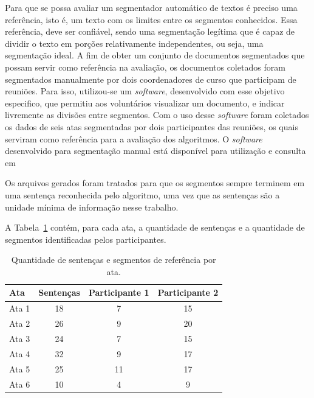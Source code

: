  Para que se possa avaliar um segmentador automático de textos é preciso uma referência, isto é, um texto com os limites entre os segmentos conhecidos. Essa referência, deve ser confiável, sendo uma segmentação legítima que é capaz de dividir o texto em porções relativamente independentes, ou seja, uma segmentação ideal.
A fim de obter um conjunto de documentos segmentados que possam servir como referência na avaliação, os documentos coletados foram segmentados manualmente por dois coordenadores de curso que participam de reuniões. Para isso, utilizou-se um \textit{software}, desenvolvido com esse objetivo especifico, que permitiu aos voluntários visualizar um documento, e indicar livremente as divisões entre segmentos. Com o uso desse \textit{software} foram coletados os dados de seis atas segmentadas por dois participantes das reuniões, os quais serviram como referência para a avaliação dos algoritmos. O \textit{software} desenvolvido para segmentação manual está disponível para utilização e consulta em~\urlsoftwares

Os arquivos gerados foram tratados para que os segmentos sempre terminem em uma sentença reconhecida pelo algoritmo, uma vez que as sentenças são a unidade mínima de informação nesse trabalho.

A Tabela~\ref{tab:segmentacaoreferencia} contém, para cada ata, a quantidade de sentenças e a quantidade de segmentos identificadas pelos participantes.



\begin{table}[!h]
	\centering
	\begin{tabular}{|l|c|c|c|} \hline
		\textbf{Ata} & \textbf{Sentenças}  & 
		\textbf{Participante 1}  & 
		\textbf{Participante 2} \\	\hline

		Ata 1 & 18 & 7  & 15 \\ \hline 
		Ata 2 & 26 & 9  & 20 \\ \hline 
		Ata 3 & 24 & 7  & 15 \\ \hline 
		Ata 4 & 32 & 9  & 17 \\ \hline 
		Ata 5 & 25 & 11 & 17 \\ \hline 
		Ata 6 & 10 & 4  & 9  \\ \hline 

	\end{tabular}
	\caption{Quantidade de sentenças e segmentos de referência por ata.}
	\label{tab:segmentacaoreferencia}
\end{table}




